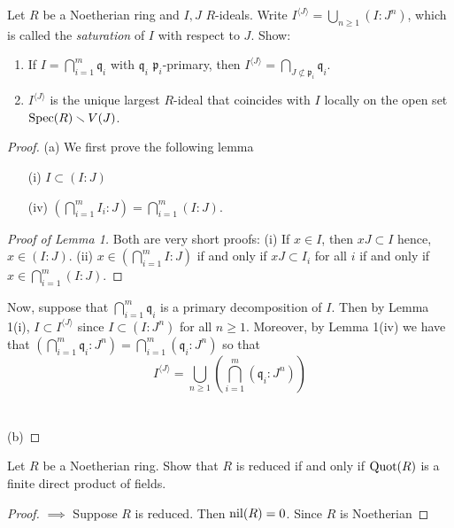 \begin{problem}
Let $R$ be a Noetherian ring and $I,J$ $R$-ideals. Write
$I^{\langle  J \rangle}=\bigcup_{n\geq 1}(I:J^n)$, which is
called the \emph{saturation} of $I$ with respect to $J$. Show:
\begin{enumerate}[label=(\alph*)]
\item If $I=\bigcap_{i=1}^m\mathfrak{q}_i$ with $\mathfrak{q}_i$
  $\mathfrak{p}_i$-primary, then $I^{\langle
    J\rangle}=\bigcap_{J\nsubset\mathfrak{p}_i}\mathfrak{q}_i$.
\item $I^{\langle  J \rangle}$ is the unique largest $R$-ideal
  that coincides with $I$ locally on the open set
  $\operatorname{Spec}(R)\smallsetminus V(J)$.
\end{enumerate}
\end{problem}
\begin{proof}
(a) We first prove the following lemma
\begin{lemma}
\begin{itemize}[noitemsep]
\item[\normalfont(i)] $I\subset (I:J)$
\item[\normalfont(iv)] $\left(\bigcap_{i=1}^m
    I_i:J\right)=\bigcap_{i=1}^m(I:J)$.
\end{itemize}
\end{lemma}
\begin{proof}[Proof of Lemma 1]
\renewcommand\qedsymbol{$\clubsuit$}
Both are very short proofs: (i) If $x\in I$, then $xJ\subset I$ hence,
$x\in (I:J)$. (ii) $x\in\left(\bigcap_{i=1}^m I:J\right)$ if and only if
$xJ\subset I_i$ for all $i$ if and only if $x\in\bigcap_{i=1}^m(I:J)$.
\end{proof}
Now, suppose that $\bigcap_{i=1}^m\mathfrak{q}_i$ is a primary
decomposition of $I$. Then by Lemma 1(i), $I\subset I^{\langle J\rangle}$
since $I\subset (I:J^n)$ for all $n\geq 1$. Moreover, by Lemma 1(iv) we
have that
$\left(\bigcap_{i=1}^m\mathfrak{q}_i:J^n\right)=\bigcap_{i=1}^m(\mathfrak{q}_i:J^n)$
so that
\[
I^{\langle  J\rangle}=\bigcup_{n\geq 1}\left(\bigcap_{i=1}^m(\mathfrak{q}_i:J^n)\right)
\]
\\\\
(b)
\end{proof}
\newpage
\begin{problem}
Let $R$ be a Noetherian ring. Show that $R$ is reduced if and
only if $\operatorname{Quot}(R)$ is a finite direct product of fields.
\end{problem}
\begin{proof}
$\implies$ Suppose $R$ is reduced. Then $\operatorname{nil}(R)=0$. Since $R$ is Noetherian
\end{proof}
